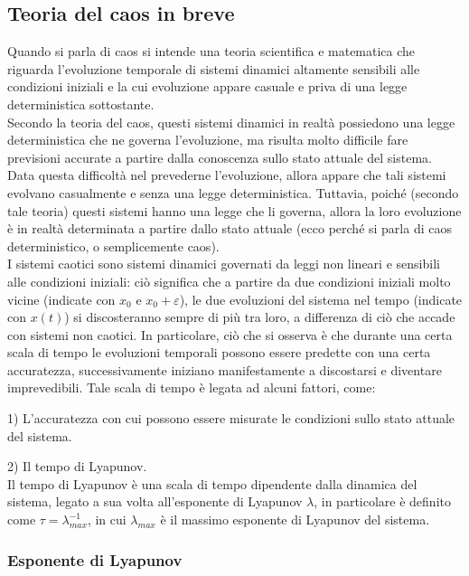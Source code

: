 \documentclass[12pt]{article}
\begin{document}
\subsection{Teoria del caos in breve}
Quando si parla di caos si intende una teoria scientifica e matematica che riguarda l'evoluzione temporale di sistemi dinamici altamente sensibili alle condizioni iniziali e la cui evoluzione appare casuale e priva di una legge deterministica sottostante. \\
Secondo la teoria del caos, questi sistemi dinamici in realtà possiedono una legge deterministica che ne governa l'evoluzione, ma risulta molto difficile fare previsioni accurate a partire dalla conoscenza sullo stato attuale del sistema. Data questa difficoltà nel prevederne l'evoluzione, allora appare che tali sistemi evolvano casualmente e senza una legge deterministica.
Tuttavia, poiché (secondo tale teoria) questi sistemi hanno una legge che li governa, allora la loro evoluzione è in realtà determinata a partire dallo stato attuale (ecco perché si parla di caos  deterministico, o semplicemente caos). \\
I sistemi caotici sono sistemi dinamici governati da leggi non lineari e sensibili alle condizioni iniziali: ciò significa che a partire da due condizioni iniziali molto vicine (indicate con $x_0$ e $x_0 + \varepsilon$), le due evoluzioni del sistema nel tempo (indicate con $x(t)$) si discosteranno sempre di più tra loro, a differenza di ciò che accade con sistemi non caotici.
In particolare, ciò che si osserva è che durante una certa scala di tempo le evoluzioni temporali possono essere predette con una certa accuratezza, successivamente iniziano manifestamente a discostarsi e diventare imprevedibili. Tale scala di tempo è legata ad alcuni fattori, come:

1) L'accuratezza con cui possono essere misurate le condizioni sullo stato attuale del sistema. 

2) Il tempo di Lyapunov. \\ 
Il tempo di Lyapunov è una scala di tempo dipendente dalla dinamica del sistema, legato a sua volta all'esponente di Lyapunov $\lambda$, in particolare è definito come $\tau = \lambda_{max}^{-1}$, in cui $\lambda_{max}$ è il massimo esponente di Lyapunov del sistema.

\subsubsection{Esponente di Lyapunov}
\end{document}
